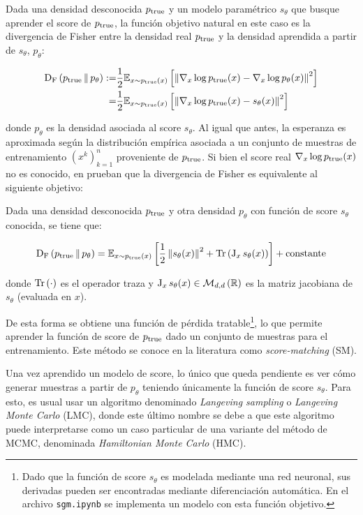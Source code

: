 Dada una densidad desconocida $p_{\operatorname{true}}$ y un modelo paramétrico $s_\theta$ que busque aprender el score de $p_{\operatorname{true}}$, la función objetivo natural en este caso es la divergencia de Fisher entre la densidad real $p_{\operatorname{true}}$ y la densidad aprendida a partir de $s_\theta$, $p_\theta$:

\begin{align*}
    \operatorname{D_F}\left(p_{\operatorname{true}}\,\|\,p_\theta\right) := & \frac{1}{2}\mathbb{E}_{x\sim p_{\operatorname{true}}(x)}\left[\left\lVert \nabla_x\log p_{\operatorname{true}}(x) - \nabla_x\log p_\theta(x) \right\rVert^2\right] \\
    =                        & \frac{1}{2}\mathbb{E}_{x\sim p_{\operatorname{true}}(x)}\left[\left\lVert \nabla_x\log p_{\operatorname{true}}(x) - s_\theta(x) \right\rVert^2\right]
\end{align*}

donde $p_\theta$ es la densidad asociada al score $s_\theta$. Al igual que antes, la esperanza es aproximada según la distribución empírica asociada a un conjunto de muestras de entrenamiento $(x^k)_{k=1}^n$ proveniente de $p_{\operatorname{true}}$. Si bien el score real $\nabla_x\log p_{\operatorname{true}}(x)$ no es conocido, en \cite{hyvarinen2005estimation} prueban que la divergencia de Fisher es equivalente al siguiente objetivo:

\begin{prop}
    Dada una densidad desconocida $p_{\operatorname{true}}$ y otra densidad $p_\theta$ con función de score $s_\theta$ conocida, se tiene que:

    \begin{equation*}
        \label{eq:sm_objective}
        \operatorname{D_F}\left(p_{\operatorname{true}}\,\|\,p_\theta\right) =
        \mathbb{E}_{x\sim p_{\operatorname{true}}(x)}\left[\frac{1}{2}\left\lVert s_\theta(x) \right\rVert^2 + \operatorname{Tr}\left(\operatorname{J}_x s_\theta(x)\right)\right] + \operatorname{constante}
    \end{equation*}

    donde $\operatorname{Tr}\left(\cdot\right)$ es el operador traza y $\operatorname{J}_x s_\theta(x)\in\mathcal{M}_{d,d}\left(\mathbb{R}\right)$ es la matriz jacobiana de $s_\theta$ (evaluada en $x$).
\end{prop}

De esta forma se obtiene una función de pérdida tratable\footnote{Dado que la función de score $s_\theta$ es modelada mediante una red neuronal, sus derivadas pueden ser encontradas mediante diferenciación automática. En el archivo \texttt{sgm.ipynb} se implementa un modelo con esta función objetivo.}, lo que permite aprender la función de score de $p_{\operatorname{true}}$ dado un conjunto de muestras para el entrenamiento. Este método se conoce en la literatura como \textit{score-matching} (SM).

Una vez aprendido un modelo de score, lo único que queda pendiente es ver cómo generar muestras a partir de $p_\theta$ teniendo únicamente la función de score $s_\theta$. Para esto, es usual usar un algoritmo denominado \textit{Langeving sampling} o \textit{Langeving Monte Carlo} (LMC), donde este último nombre se debe a que este algoritmo puede interpretarse como un caso particular de una variante del método de MCMC, denominada \textit{Hamiltonian Monte Carlo} (HMC).

